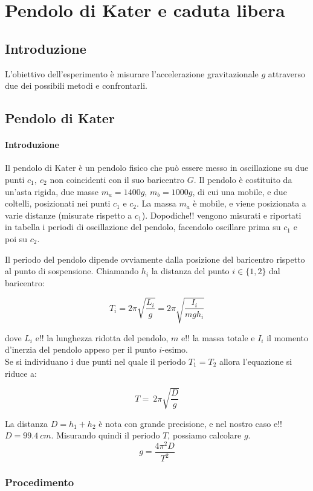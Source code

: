 \chapter{Pendolo di Kater e caduta libera}
\section{Introduzione}

L'obiettivo dell'esperimento è misurare l'accelerazione gravitazionale $g$ attraverso due dei possibili metodi e confrontarli. 

\section{Pendolo di Kater}
\subsubsection{Introduzione}

Il pendolo di Kater è un pendolo fisico che può essere messo in oscillazione su due punti $c_1,\ c_2$ non coincidenti con il suo baricentro $G$. Il pendolo è costituito da un'asta rigida, due masse $m_a = 1400g$, $m_b=1000g$, di cui una mobile, e due coltelli, posizionati nei punti $c_1$ e $c_2$. La massa $m_a$ è mobile, e viene posizionata a varie distanze (misurate rispetto a $c_1$). Dopodiche!! vengono misurati e riportati in tabella i periodi di oscillazione del pendolo, facendolo oscillare prima su $c_1$ e poi su $c_2$.

Il periodo del pendolo dipende ovviamente dalla posizione del baricentro rispetto al punto di sospensione. Chiamando $h_i$ la distanza del punto $i\in\{1,2\}$ dal baricentro:

$$ T_i = 2 \pi \sqrt{\frac{L_i}{g}} = 2 \pi \sqrt{\frac{I_i}{m gh_i}}$$

dove $L_i$ e!! la lunghezza ridotta del pendolo, $m$ e!! la massa totale e $I_i$ il momento d'inerzia del pendolo appeso per il punto $i$-esimo.
\\
Se si individuano i due punti nel quale il periodo $T_1 = T_2$ allora l'equazione si riduce a:

$$ T = \ 2 \pi \sqrt{\frac{D}{g}}$$

La distanza $D= h_1 + h_2 $  è nota con grande precisione, e nel nostro caso e!! $D=99.4\ cm$. Misurando quindi il periodo $T$, possiamo calcolare $g$.
$$ g = \frac{4\pi^2D}{T^2}$$
\subsection{Procedimento}

